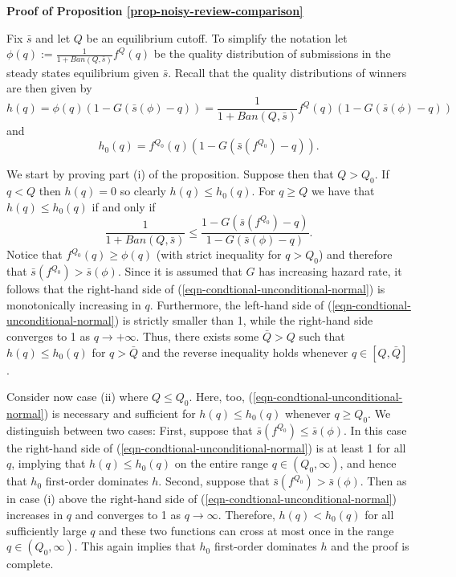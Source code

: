 \documentclass[12pt]{article}
\theoremstyle{plain}
\theoremstyle{definition}
\theoremstyle{remark}
\begin{document}
\bigskip

\noindent \textbf{Proof of Proposition \ref{prop-noisy-review-comparison}}

    Fix $\bar s$ and let $Q$ be an equilibrium cutoff. To simplify the notation let $\phi(q) := \frac{1}{1+Ban(Q,\bar s)}f^{Q}(q)$ be the quality distribution of submissions in the steady states equilibrium given $\bar s$. Recall that the quality distributions of winners are then given by
    $$h(q)=\phi(q)(1-G(\bar s(\phi)-q)) = \frac{1}{1+Ban(Q,\bar s)}f^{Q}(q)(1-G(\bar s(\phi)-q))$$
    and 
    $$h_0(q)=f^{Q_0}(q)\left(1-G\left(\bar s\left(f^{Q_0}\right)-q\right)\right).$$

    We start by proving part (i) of the proposition. Suppose then that $Q>Q_0$. If $q<Q$ then $h(q)=0$ so clearly $h(q)\le h_0(q)$. For $q\ge Q$ we have that $h(q)\le h_0(q)$ if and only if
    \begin{equation}\label{eqn-condtional-unconditional-normal}
        \frac{1}{1+Ban(Q, \bar s)} \le \frac{1-G\left(\bar s\left(f^{Q_0}\right)-q\right)}{1-G(\bar s (\phi)-q)}.
    \end{equation}
    Notice that $f^{Q_0}(q)\ge \phi(q)$ (with strict inequality for $q>Q_0$) and therefore that $\bar s\left(f^{Q_0}\right) > \bar s (\phi)$. Since it is assumed that $G$ has increasing hazard rate, it follows that the right-hand side of (\ref{eqn-condtional-unconditional-normal}) is monotonically increasing in $q$. Furthermore, the left-hand side of (\ref{eqn-condtional-unconditional-normal}) is strictly smaller than 1, while the right-hand side converges to 1 as $q\to +\infty$. Thus, there exists some $\bar Q>Q$ such that $h(q)\le h_0(q)$ for $q>\bar Q$ and the reverse inequality holds whenever $q\in [Q,\bar Q]$.  

    Consider now case (ii) where $Q\le Q_0$. Here, too, (\ref{eqn-condtional-unconditional-normal}) is necessary and sufficient for $h(q)\le h_0(q)$ whenever $q\ge Q_0$. We distinguish between two cases: First, suppose that $\bar s\left(f^{Q_0}\right)\le \bar s (\phi)$. In this case the right-hand side of (\ref{eqn-condtional-unconditional-normal}) is at least 1 for all $q$, implying that $h(q)\le h_0(q)$ on the entire range $q\in (Q_0,\infty)$, and hence that $h_0$ first-order dominates $h$. Second, suppose that $\bar s\left(f^{Q_0}\right)> \bar s (\phi)$. Then as in case (i) above the right-hand side of (\ref{eqn-condtional-unconditional-normal}) increases in $q$ and converges to 1 as $q\to \infty$. Therefore, $h(q)< h_0(q)$ for all sufficiently large $q$ and these two functions can cross at most once in the range $q\in (Q_0,\infty)$. This again implies that $h_0$ first-order dominates $h$ and the proof is complete.
\end{document}
